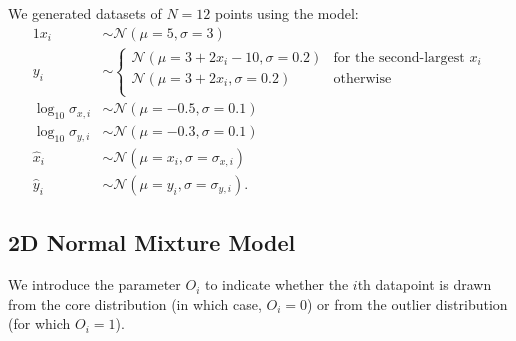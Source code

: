 \documentclass[fleqn,usenatbib]{mnras}
\begin{document}
We generated datasets of $N = 12$ points using the model:
\begin{alignat}{1}
    x_i& \sim \mathcal N (\mu = 5, \sigma = 3) \\
    y_i& \sim
    \begin{cases}
        \mathcal N (\mu = 3 + 2 x_i - 10, \sigma = 0.2) &
            \text{for the second-largest $x_i$} \\
        \mathcal N (\mu = 3 + 2 x_i, \sigma = 0.2) &
            \text{otherwise} \\
    \end{cases}\\
    \log_{10} \sigma_{x, i}& \sim \mathcal N (\mu = -0.5, \sigma = 0.1) \\
    \log_{10} \sigma_{y, i}& \sim \mathcal N (\mu = -0.3, \sigma = 0.1) \\
    \hat{x}_i& \sim \mathcal N (\mu = x_i, \sigma = \sigma_{x, i}) \\
    \hat{y}_i& \sim \mathcal N (\mu = y_i, \sigma = \sigma_{y, i}).
\end{alignat}

\subsection{2D Normal Mixture Model}
\label{sec:data-models.gmm}

We introduce the parameter $O_i$ to indicate whether the $i$th datapoint is
drawn from the core distribution (in which case, $O_i = 0$) or from the outlier
distribution (for which $O_i = 1$).
\end{document}

